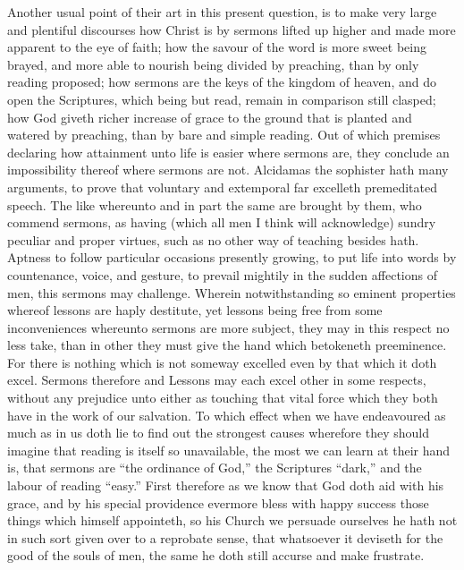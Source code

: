 Another usual point of their art in this present question, is to make very large and plentiful discourses how Christ is by sermons lifted up higher and made more apparent to the eye of faith; how the savour of the word is more sweet being brayed, and more able to nourish being divided by preaching, than by only reading proposed; how sermons are the keys of the kingdom of heaven, and do open the Scriptures, which being but read, remain in comparison still clasped; how God giveth richer increase of grace  to the ground that is planted and watered by preaching, than by bare and simple reading. Out of which premises declaring how attainment unto life is easier where sermons are, they conclude an impossibility thereof where sermons are not.
Alcidamas the sophister hath many arguments, to prove that voluntary and extemporal far excelleth premeditated speech. The like whereunto and in part the same are brought by them, who commend sermons, as having (which all men I think will acknowledge) sundry peculiar and proper virtues, such as no other way of teaching besides hath. Aptness to follow particular occasions presently growing, to put life into words by countenance, voice, and gesture, to prevail mightily in the sudden affections of men, this sermons may challenge. Wherein notwithstanding so eminent properties whereof lessons are haply destitute, yet lessons being free from some inconveniences whereunto sermons are more subject, they may in this respect no less take, than in other they must give the hand which betokeneth preeminence. For there is nothing which is not someway excelled even by that which it doth excel. Sermons therefore and Lessons may each excel other in some respects, without any prejudice unto either as touching that vital force which they both have in the work of our salvation.
To which effect when we have endeavoured as much as in us doth lie to find out the strongest causes wherefore they should imagine that reading is itself so unavailable, the most we can learn at their hand is, that sermons are “the ordinance of God,” the Scriptures “dark,” and the labour of reading “easy.”
First therefore as we know that God doth aid with his grace, and by his special providence evermore bless with happy success those things which himself appointeth, so his Church we persuade ourselves he hath not in such sort given over to a reprobate sense, that whatsoever it deviseth for the good of the souls of men, the same he doth still accurse and make frustrate.
